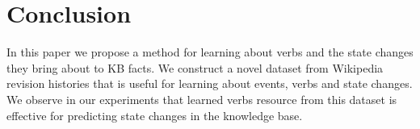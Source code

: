 \section{Conclusion}
In this paper we propose a method for learning about verbs and the state changes they bring about to KB facts. We construct a novel dataset from Wikipedia revision histories that is useful for learning about events, verbs and state changes. We observe in our experiments that learned verbs resource from this dataset is effective for predicting state changes in the knowledge base. 


